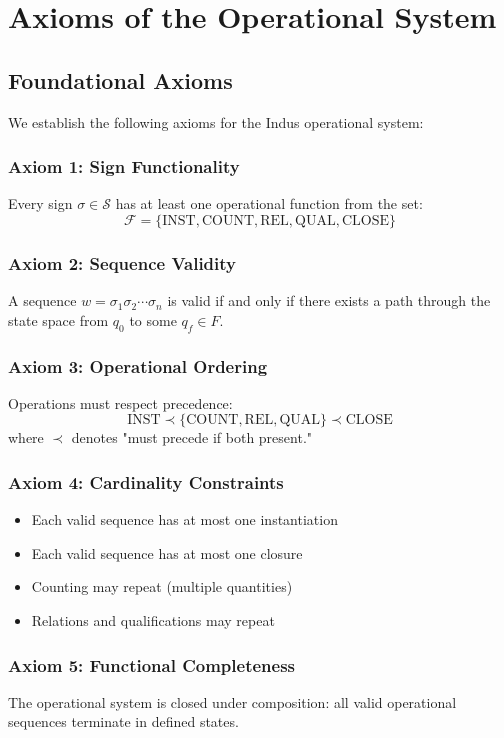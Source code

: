 \section{Axioms of the Operational System}

\subsection{Foundational Axioms}

We establish the following axioms for the Indus operational system:

\subsubsection{Axiom 1: Sign Functionality}
Every sign $\sigma \in \mathcal{S}$ has at least one operational function from the set:
\[
\mathcal{F} = \{\text{INST}, \text{COUNT}, \text{REL}, \text{QUAL}, \text{CLOSE}\}
\]

\subsubsection{Axiom 2: Sequence Validity}
A sequence $w = \sigma_1\sigma_2\cdots\sigma_n$ is valid if and only if there exists a path through the state space from $q_0$ to some $q_f \in F$.

\subsubsection{Axiom 3: Operational Ordering}
Operations must respect precedence:
\[
\text{INST} \prec \{\text{COUNT}, \text{REL}, \text{QUAL}\} \prec \text{CLOSE}
\]
where $\prec$ denotes "must precede if both present."

\subsubsection{Axiom 4: Cardinality Constraints}
\begin{itemize}
    \item Each valid sequence has at most one instantiation
    \item Each valid sequence has at most one closure
    \item Counting may repeat (multiple quantities)
    \item Relations and qualifications may repeat
\end{itemize}

\subsubsection{Axiom 5: Functional Completeness}
The operational system is closed under composition: all valid operational sequences terminate in defined states.

